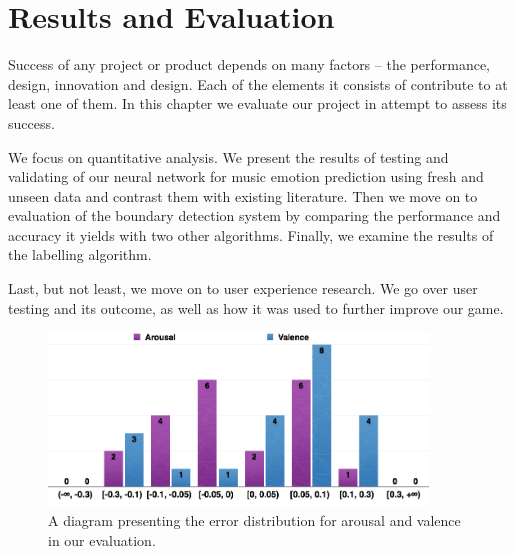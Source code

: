 
\chapter{Results and Evaluation} %

\label{Chapter6} %

\fancyhead[LE,RO]{\thepage}


Success of any project or product depends on many factors -- the performance, design, innovation and design. Each of the elements it consists of contribute to at least one of them. 
In this chapter we evaluate our project in attempt to assess its success.

We focus on quantitative analysis. We present the results of testing and validating of our neural network for music emotion prediction using fresh and unseen data and contrast them with existing literature. Then we move on to evaluation of the boundary detection system by comparing the performance and accuracy it yields with two other algorithms. Finally, we examine the results of the labelling algorithm.

Last, but not least, we move on to user experience research. We go over user testing and its outcome, as well as how it was used to further improve our game. 

\begin{figure}[b]
    \includegraphics[width=0.9\textwidth]{Figures/errors-mood}
    \centering

  \caption{A diagram presenting the error distribution for arousal and valence in our evaluation.}
  \label{fig:errors-mood}
\end{figure}


\vspace{10pt}

